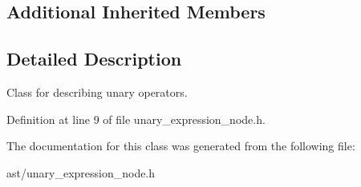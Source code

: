 \subsection*{Additional Inherited Members}


\subsection{Detailed Description}
Class for describing unary operators. 

Definition at line 9 of file unary\+\_\+expression\+\_\+node.\+h.



The documentation for this class was generated from the following file\+:\begin{DoxyCompactItemize}
\item 
ast/unary\+\_\+expression\+\_\+node.\+h\end{DoxyCompactItemize}

